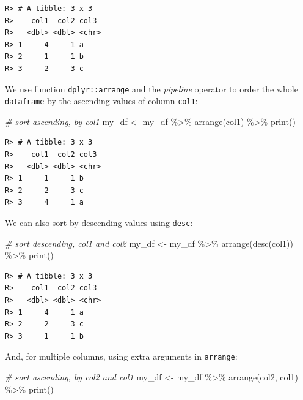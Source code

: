 \documentclass[
  12pt,
]{book}
\newenvironment{Shaded}{\begin{snugshade}}{\end{snugshade}}
\newcommand{\CommentTok}[1]{\textcolor[rgb]{0.37,0.37,0.37}{\textit{#1}}}
\newcommand{\FunctionTok}[1]{\textcolor[rgb]{0,0,0}{#1}}
\newcommand{\NormalTok}[1]{#1}
\newcommand{\OtherTok}[1]{\textcolor[rgb]{0.37,0.37,0.37}{#1}}
\newcommand{\SpecialCharTok}[1]{\textcolor[rgb]{0,0,0}{#1}}
\begin{document}
\begin{verbatim}
R> # A tibble: 3 x 3
R>    col1  col2 col3 
R>   <dbl> <dbl> <chr>
R> 1     4     1 a    
R> 2     1     1 b    
R> 3     2     3 c
\end{verbatim}

We use function \texttt{dplyr::arrange} and the \emph{pipeline} operator to order the whole \texttt{dataframe} by the ascending values of column \texttt{col1}:

\begin{Shaded}
\begin{Highlighting}[]
\CommentTok{\# sort ascending, by col1 }
\NormalTok{my\_df }\OtherTok{\textless{}{-}}\NormalTok{ my\_df }\SpecialCharTok{\%\textgreater{}\%}
  \FunctionTok{arrange}\NormalTok{(col1) }\SpecialCharTok{\%\textgreater{}\%}
  \FunctionTok{print}\NormalTok{()}
\end{Highlighting}
\end{Shaded}

\begin{verbatim}
R> # A tibble: 3 x 3
R>    col1  col2 col3 
R>   <dbl> <dbl> <chr>
R> 1     1     1 b    
R> 2     2     3 c    
R> 3     4     1 a
\end{verbatim}

We can also sort by descending values using \texttt{desc}:

\begin{Shaded}
\begin{Highlighting}[]
\CommentTok{\# sort descending, col1 and col2}
\NormalTok{my\_df }\OtherTok{\textless{}{-}}\NormalTok{ my\_df }\SpecialCharTok{\%\textgreater{}\%}
  \FunctionTok{arrange}\NormalTok{(}\FunctionTok{desc}\NormalTok{(col1)) }\SpecialCharTok{\%\textgreater{}\%}
  \FunctionTok{print}\NormalTok{()}
\end{Highlighting}
\end{Shaded}

\begin{verbatim}
R> # A tibble: 3 x 3
R>    col1  col2 col3 
R>   <dbl> <dbl> <chr>
R> 1     4     1 a    
R> 2     2     3 c    
R> 3     1     1 b
\end{verbatim}

And, for multiple columns, using extra arguments in \texttt{arrange}:

\begin{Shaded}
\begin{Highlighting}[]
\CommentTok{\# sort ascending, by col2 and col1}
\NormalTok{my\_df }\OtherTok{\textless{}{-}}\NormalTok{ my\_df }\SpecialCharTok{\%\textgreater{}\%}
  \FunctionTok{arrange}\NormalTok{(col2, col1) }\SpecialCharTok{\%\textgreater{}\%}
  \FunctionTok{print}\NormalTok{()}
\end{Highlighting}
\end{Shaded}
\end{document}
